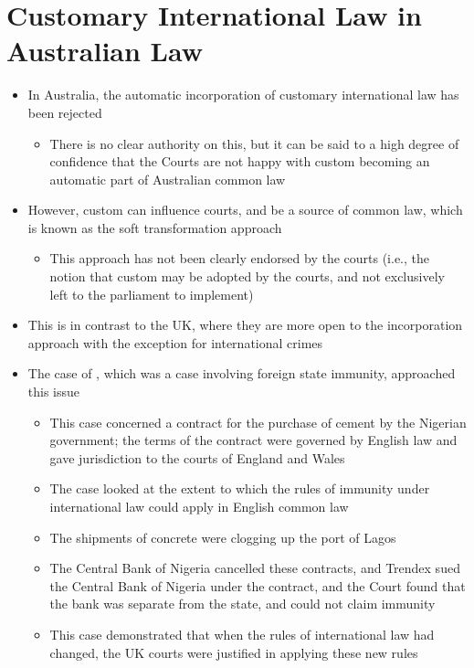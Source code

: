 \section{Customary International Law in Australian Law}
\begin{itemize}
    \item In Australia, the automatic incorporation of customary international law has been rejected
    \begin{itemize}
        \item There is no clear authority on this, but it can be said to a high degree of confidence that the Courts are not happy with custom becoming an automatic part of Australian common law
    \end{itemize}
    \item However, custom can influence courts, and be a source of common law, which is known as the soft transformation approach
    \begin{itemize}
        \item This approach has not been clearly endorsed by the courts (i.e., the notion that custom may be adopted by the courts, and not exclusively left to the parliament to implement)
    \end{itemize}
    \item This is in contrast to the UK, where they are more open to the incorporation approach with the exception for international crimes
    \item The case of , which was a case involving foreign state immunity, approached this issue
    \begin{itemize}
        \item This case concerned a contract for the purchase of cement by the Nigerian government; the terms of the contract were governed by English law and gave jurisdiction to the courts of England and Wales
        \item The case looked at the extent to which the rules of immunity under international law could apply in English common law
        \item The shipments of concrete were clogging up the port of Lagos
        \item The Central Bank of Nigeria cancelled these contracts, and Trendex sued the Central Bank of Nigeria under the contract, and the Court found that the bank was separate from the state, and could not claim immunity
        \item This case demonstrated that when the rules of international law had changed, the UK courts were justified in applying these new rules

\end{itemize}
\end{itemize}

